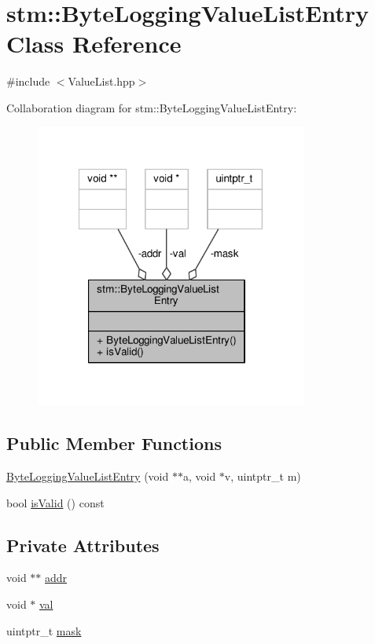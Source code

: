 \hypertarget{classstm_1_1ByteLoggingValueListEntry}{\section{stm\-:\-:Byte\-Logging\-Value\-List\-Entry Class Reference}
\label{classstm_1_1ByteLoggingValueListEntry}
}


{\ttfamily \#include $<$Value\-List.\-hpp$>$}



Collaboration diagram for stm\-:\-:Byte\-Logging\-Value\-List\-Entry\-:
\nopagebreak
\begin{figure}[H]
\begin{center}
\leavevmode
\includegraphics[width=254pt]{classstm_1_1ByteLoggingValueListEntry__coll__graph}
\end{center}
\end{figure}
\subsection*{Public Member Functions}
\begin{DoxyCompactItemize}
\item 
\hyperlink{classstm_1_1ByteLoggingValueListEntry_af70b0f133c0c3be7009dd0f27a56b19e}{Byte\-Logging\-Value\-List\-Entry} (void $\ast$$\ast$a, void $\ast$v, uintptr\-\_\-t m)
\item 
bool \hyperlink{classstm_1_1ByteLoggingValueListEntry_a2fe0d03e9839d0683cce124a9edd6795}{is\-Valid} () const 
\end{DoxyCompactItemize}
\subsection*{Private Attributes}
\begin{DoxyCompactItemize}
\item 
void $\ast$$\ast$ \hyperlink{classstm_1_1ByteLoggingValueListEntry_af8f2497fb19517a21dab23a99a89a562}{addr}
\item 
void $\ast$ \hyperlink{classstm_1_1ByteLoggingValueListEntry_a27e92d283a385a490452265a73f03d44}{val}
\item 
uintptr\-\_\-t \hyperlink{classstm_1_1ByteLoggingValueListEntry_ad3a8699b42840bd57e487072c92c8012}{mask}
\end{DoxyCompactItemize}


